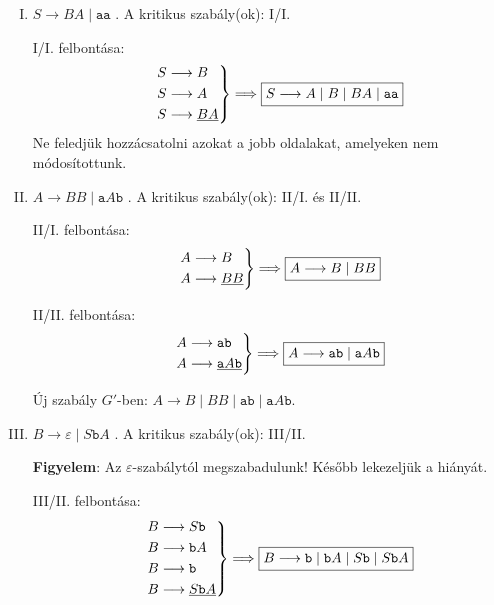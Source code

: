\documentclass[a4paper,11pt]{article}
\newcommand{\emptyword}{\varepsilon}
\newcommand{\prodrule}[2]{#1 \longrightarrow #2}
\begin{document}
\begin{enumerate}[I.]
	\item $\boxed{\prodrule{S}{BA \mid \texttt{aa}}}$ . A kritikus szabály(ok): I/I.
	
	I/I. felbontása:
	\[
		\begin{rcases}
			& \prodrule{S}{B} \\
			& \prodrule{S}{A} \\
			& \prodrule{S}{\underline{BA}}
		\end{rcases}
		\Longrightarrow \boxed{\prodrule{S}{A \mid B \mid BA \mid \texttt{aa}}}
	\]
	Ne feledjük hozzácsatolni azokat a jobb oldalakat, amelyeken nem módosítottunk.
	\item $\boxed{\prodrule{A}{BB \mid \texttt{a}A\texttt{b}}}$ . A kritikus szabály(ok): II/I. és II/II.
	
	II/I. felbontása:
	\[
	\begin{rcases}
		& \prodrule{A}{B} \\
		& \prodrule{A}{\underline{BB}}
	\end{rcases}
	\Longrightarrow \boxed{\prodrule{A}{B \mid BB}}
	\]
	
	II/II. felbontása:
	\[
	\begin{rcases}
		& \prodrule{A}{\texttt{ab}} \\
		& \prodrule{A}{\underline{\texttt{a}A\texttt{b}}}
	\end{rcases}
	\Longrightarrow \boxed{\prodrule{A}{\texttt{ab} \mid \texttt{a}A\texttt{b}}}
	\]
	
	Új szabály $G'$-ben: $\boxed{\prodrule{A}{B \mid BB \mid \texttt{ab} \mid \texttt{a}A\texttt{b}}}$.
	
	\item $\boxed{\prodrule{B}{\emptyword \mid S\texttt{b}A}}$ . A kritikus szabály(ok): III/II.
	
	\textbf{Figyelem}: Az $\emptyword$-szabálytól megszabadulunk! Később lekezeljük a hiányát.
	
	III/II. felbontása:
	\[
	\begin{rcases}
		& \prodrule{B}{S\texttt{b}} \\
		& \prodrule{B}{\texttt{b}A} \\
		& \prodrule{B}{\texttt{b}} \\ 
		& \prodrule{B}{\underline{S\texttt{b}A}}
	\end{rcases}
	\Longrightarrow \boxed{\prodrule{B}{\texttt{b} \mid \texttt{b}A \mid S\texttt{b} \mid S\texttt{b}A}}
	\]
\end{enumerate}
\end{document}
